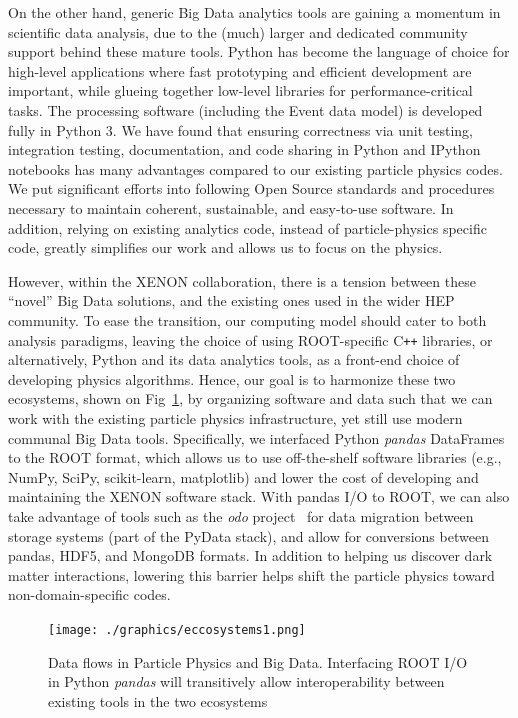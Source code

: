 \documentclass[a4paper]{jpconf}
\begin{document}
On the other hand, generic Big Data analytics tools are gaining a momentum in scientific data analysis, due to the (much) larger and dedicated community support behind these mature tools.
Python has become the language of choice for high-level applications where fast 
prototyping and efficient development are important, while glueing together 
low-level libraries for performance-critical tasks.
The processing software (including the Event data model) is developed fully in Python 3. 
We have found that ensuring correctness via unit testing, integration testing, documentation, and code
sharing in Python and IPython notebooks has many advantages compared to our existing particle
physics codes. We put significant efforts into following Open Source standards and procedures necessary to maintain 
coherent, sustainable, and easy-to-use software. In addition, relying on existing analytics code, instead of particle-physics specific code, greatly
simplifies our work and allows us to focus on the physics.

However, within the XENON collaboration, there is a tension between these ``novel'' Big Data solutions, and the existing ones used in the wider HEP community.
To ease the transition, our computing model should cater to both analysis paradigms, leaving the choice of using ROOT-specific C\texttt{++} libraries, or alternatively, 
Python and its data analytics tools, as a 
front-end choice of developing physics algorithms. 
Hence, our goal is to harmonize these two ecosystems, shown on Fig~\ref{fig:two_eccosystems}, by organizing software and data
such that we can work with the existing particle physics infrastructure, yet still use modern communal Big Data tools.
Specifically, we interfaced Python \textit{pandas} DataFrames to the ROOT format, which allows us to use 
off-the-shelf software libraries (e.g., NumPy, SciPy, scikit-learn, matplotlib) and lower the cost of developing and maintaining the XENON software stack. 
With pandas I/O to ROOT, we
can also take advantage of tools such as the \textit{odo} project~\cite{odo-pydata} for data migration between storage systems (part of the PyData stack), and allow for conversions between
pandas, HDF5, and MongoDB formats. 
In addition to helping us discover dark matter interactions, lowering this barrier helps shift the particle physics
toward non-domain-specific codes.

\begin{figure}[!t]
\centering
\begin{center}
\texttt{[image: ./graphics/eccosystems1.png]}
\caption{Data flows in Particle Physics and Big Data. Interfacing ROOT I/O in Python \textit{pandas} will transitively allow interoperability between existing tools in the two ecosystems}
\label{fig:two_eccosystems}
\end{center}
\end{figure}
\end{document}
